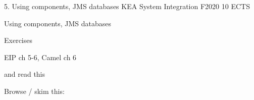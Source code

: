 \documentclass[Screen16to9,17pt]{foils}
\begin{document}
\mytitlepage
{5. Using components, JMS
 databases}
{KEA System Integration F2020 10 ECTS}


\begin{list2}
\item
Using components, JMS
 databases

\item
\item
\end{list2}

Exercises
\begin{list2}
\item
\item
\end{list2}




\begin{list1}
\item EIP ch 5-6, Camel ch 6

and read this\\

\item Browse / skim this:\\

\end{list1}




\slidenext
\end{document}
